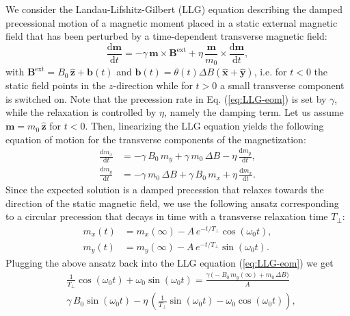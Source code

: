 \documentclass[prb,footinbib,showpacs,twocolumn,amsmath,amssymb]{revtex4}
\newcommand{\VEC}[1]{\mathbf{#1}}
\newcommand{\ud}{\mathrm{d}}
\begin{document}
We consider the Landau-Lifshitz-Gilbert (LLG) equation describing 
the damped precessional motion of
a magnetic moment placed in a static external magnetic field that has been 
perturbed by a time-dependent transverse magnetic field:
\begin{equation}\label{eq:LLG-eom}
\frac{\ud\VEC{m}}{\ud t} = -\gamma\,\VEC{m} \times \VEC{B}^{\text{ext}} + \eta\,\frac{\VEC{m}}{m_0} \times \frac{\ud\VEC{m}}{\ud t},
\end{equation}
with $\VEC{B}^{\text{ext}} = B_0\,\hat{\VEC{z}} + \textbf{b}(t)$
and $\textbf{b}(t)=\theta(t)\Delta B(\hat{\VEC{x}}+\hat{\VEC{y}})$, 
i.e. for $t < 0$ the static field points in the $z$-direction
while for $t > 0$ a small transverse component is switched on.
Note that the precession rate in Eq. (\ref{eq:LLG-eom}) 
is set by $\gamma$, while the relaxation is controlled by $\eta$, namely the damping term.
Let us assume $\VEC{m} = m_0\,\hat{\VEC{z}}$ for $t<0$.
Then, linearizing the LLG equation yields the following equation of motion for
the transverse components of the magnetization:
\begin{align}
  \frac{\ud m_x}{\ud t} &= -\gamma\,B_0\,m_y + \gamma\,m_0\,\Delta B- \eta\,\frac{\ud m_y}{\ud t} ,
  \label{eq:LLG-lin-x} \\
  \frac{\ud m_y}{\ud t} &= -\gamma\,m_0\,\Delta B + \gamma\,B_0\,m_x + \eta\,\frac{\ud m_x}{\ud t}  
  \label{eq:LLG-lin-y} .
\end{align}
Since the expected solution is a damped precession that relaxes towards the direction of the static magnetic field, we use the following ansatz corresponding to a circular precession %
that decays in time with a transverse relaxation time $T_{\perp}$:
\begin{align}
  m_x(t) &= m_x(\infty) - A\,e^{-t/T_{\perp}}\cos(\omega_0 t)  , \\
  m_y(t) &= m_y(\infty) - A\,e^{-t/T_{\perp}}\sin(\omega_0 t) .
\end{align}
Plugging the above ansatz back into the LLG equation (\ref{eq:LLG-eom}) we get
\begin{equation}
\begin{split}
  &\frac{1}{T_{\perp}}\cos(\omega_0 t) + \omega_0\sin(\omega_0 t)= 
\frac{\gamma\,\big(-B_0\,m_y(\infty) + m_0\,\Delta B\big)}{A} \\  
 & \gamma\,B_0\sin(\omega_0 t)  
    -\eta\,\left(\frac{1}{T_{\perp}}\sin(\omega_0 t) - \omega_0\cos(\omega_0 t)\right) , \\
\end{split}
\end{equation}
\end{document}
